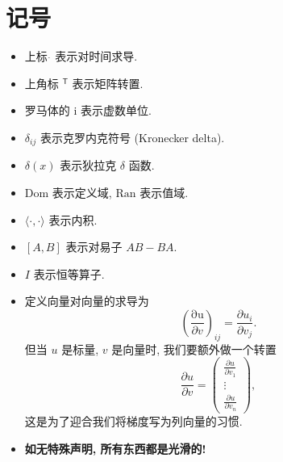 \section*{记号}
\begin{itemize}
    \item 上标 $ \dot{ } $ 表示对时间求导.
    \item 上角标 $ { }^\mathsf{T} $ 表示矩阵转置.
    
    \item 罗马体的 $ \mathrm{i} $ 表示虚数单位.

    \item $ \delta_{ij} $ 表示克罗内克符号 (Kronecker delta).
    \item $ \delta(x) $ 表示狄拉克 $ \delta $ 函数.
    
    \item $ \mathrm{Dom} $ 表示定义域, $ \mathrm{Ran} $ 表示值域.
    \item $ \langle \cdot,\cdot \rangle $ 表示内积. 
    \item $ [A,B] $ 表示对易子 $ AB-BA $.
    \item $ I $ 表示恒等算子.

    \item 定义向量对向量的求导为
    \[ \left(\frac{\mathrm{\partial u}}{\partial v}\right)_{ij}= \frac{\partial u_i}{\partial v_j} .\]
但当 $ u $ 是标量, $ v $ 是向量时, 我们要额外做一个转置
    \[ \frac{\partial u}{\partial v}=\left( \begin{matrix}
        \frac{\partial u}{\partial v_1} \\ 
        \vdots\\ 
        \frac{\partial u}{\partial v_n}
    \end{matrix} \right), \]
这是为了迎合我们将梯度写为列向量的习惯.
    \item \textbf{如无特殊声明, 所有东西都是光滑的!}
\end{itemize}